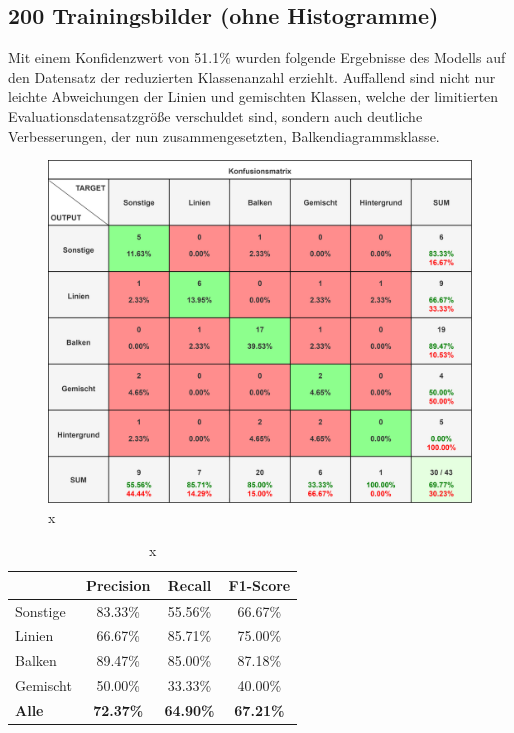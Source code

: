 \subsection*{200 Trainingsbilder (ohne Histogramme)}
Mit einem Konfidenzwert von 51.1\% wurden folgende Ergebnisse des Modells auf den Datensatz der reduzierten Klassenanzahl erziehlt. Auffallend sind nicht nur leichte Abweichungen der Linien und gemischten Klassen, welche der limitierten Evaluationsdatensatzgröße verschuldet sind, sondern auch deutliche Verbesserungen, der nun zusammengesetzten, Balkendiagrammsklasse.

\begin{figure}[H]
    \centering
    \captionsetup{width=1\linewidth}
    \includegraphics[width=1\textwidth]{Experimente/img/detect/2_val@0.511_200_nohisto/konfusionsmatrix.png}
    \caption{ x}
    \label{fig:extraction_output}
\end{figure}

\begin{table}[H]
    \centering
    \begin{tabular}{|l|c|c|c|}
        \hline
        \rowcolor[HTML]{EFEFEF}
                      & Precision        & Recall           & F1-Score         \\ \hline
        Sonstige      & 83.33\%          & 55.56\%          & 66.67\%          \\ \hline
        Linien        & 66.67\%          & 85.71\%          & 75.00\%          \\ \hline
        Balken        & 89.47\%          & 85.00\%          & 87.18\%          \\ \hline
        Gemischt      & 50.00\%          & 33.33\%          & 40.00\%          \\ \hline
        \textbf{Alle} & \textbf{72.37\%} & \textbf{64.90\%} & \textbf{67.21\%} \\ \hline
    \end{tabular}
    \caption{x}
\end{table}

